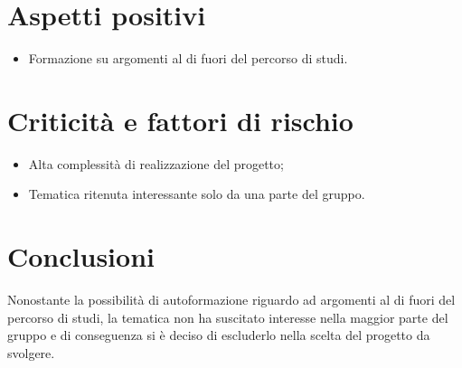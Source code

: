 \section{Aspetti positivi}
\begin{itemize}
	\item Formazione su argomenti al di fuori del percorso di studi.
\end{itemize}
\section{Criticità e fattori di rischio}
\begin{itemize}
	\item Alta complessità di realizzazione del progetto;
	\item Tematica ritenuta interessante solo da una parte del gruppo.
\end{itemize}
\section{Conclusioni}
Nonostante la possibilità di autoformazione riguardo ad argomenti al di fuori del percorso di studi, la tematica non ha suscitato interesse nella maggior parte del gruppo e di conseguenza si è deciso di escluderlo nella scelta del progetto da svolgere.